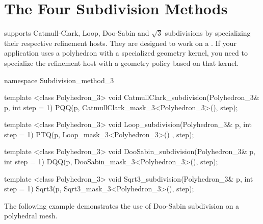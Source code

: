



\section{The Four Subdivision Methods}
 supports Catmull-Clark, Loop, 
Doo-Sabin and $\sqrt{3}$ subdivisions by specializing
their respective refinement hosts. 
They are designed to work on a . If your application 
uses a polyhedron with a specialized geometry kernel, you need to 
specialize the refinement host with a geometry policy 
based on that kernel.

\begin{ccExampleCode}
namespace Subdivision_method_3 {
  template <class Polyhedron_3>
  void CatmullClark_subdivision(Polyhedron_3& p, int step = 1) {
    PQQ(p, CatmullClark_mask_3<Polyhedron_3>(), step);
  }

  template <class Polyhedron_3>
  void Loop_subdivision(Polyhedron_3& p, int step = 1) {
    PTQ(p, Loop_mask_3<Polyhedron_3>() , step);
  }

  template <class Polyhedron_3>
  void DooSabin_subdivision(Polyhedron_3& p, int step = 1) {
    DQQ(p, DooSabin_mask_3<Polyhedron_3>(), step);
  }

  template <class Polyhedron_3>
  void Sqrt3_subdivision(Polyhedron_3& p, int step = 1) {
    Sqrt3(p, Sqrt3_mask_3<Polyhedron_3>(), step);
  }
}
\end{ccExampleCode}

The following example demonstrates the use of Doo-Sabin subdivision 
on a polyhedral mesh.

